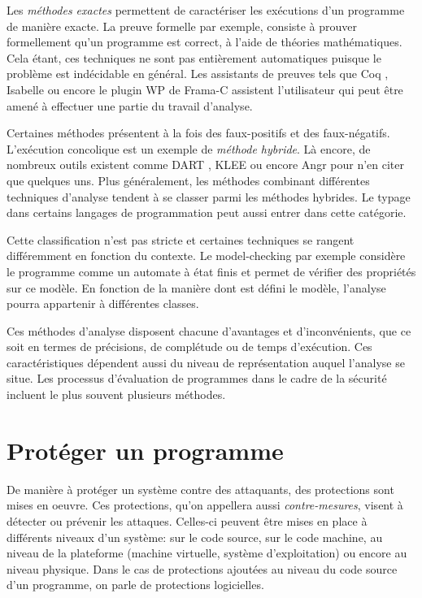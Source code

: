         Les \textit{méthodes exactes} permettent de caractériser les exécutions d'un programme de manière exacte. La preuve formelle par exemple, consiste à prouver formellement qu'un programme est correct, à l'aide de théories mathématiques. Cela étant, ces techniques ne sont pas entièrement automatiques puisque le problème est indécidable en général. Les assistants de preuves tels que Coq \cite{Coq}, Isabelle \cite{Nipokow/SSBM02} ou encore le plugin WP de Frama-C \cite{FramaC-wp} assistent l'utilisateur qui peut être amené à effectuer une partie du travail d'analyse.
        
        Certaines méthodes présentent à la fois des faux-positifs et des faux-négatifs. L'exécution concolique \cite{Baldoni/CSUR18} est un exemple de \textit{méthode hybride}. Là encore, de nombreux outils existent comme DART \cite{Godefroid/PLDI05}, KLEE \cite{Cadar/OSDI08} ou encore Angr \cite{Shoshitaishvili/SSP16} pour n'en citer que quelques uns. Plus généralement, les méthodes combinant différentes techniques d'analyse tendent à se classer parmi les méthodes hybrides.
        Le typage dans certains langages de programmation peut aussi entrer dans cette catégorie.
        
        Cette classification n'est pas stricte et certaines techniques se rangent différemment en fonction du contexte. Le model-checking par exemple considère le programme comme un automate à état finis et permet de vérifier des propriétés sur ce modèle. En fonction de la manière dont est  défini le modèle, l'analyse pourra appartenir à différentes classes. 
        
        Ces méthodes d'analyse disposent chacune d'avantages et d'inconvénients, que ce soit en termes de précisions, de complétude ou de temps d'exécution. Ces caractéristiques dépendent aussi du niveau de représentation auquel l'analyse se situe. Les processus d'évaluation de programmes dans le cadre de la sécurité incluent le plus souvent plusieurs méthodes.
        
    \section{Protéger un programme}
    
        De manière à protéger un système contre des attaquants, des protections sont mises en oeuvre. Ces protections, qu'on appellera aussi \textit{contre-mesures}, visent à détecter ou prévenir les attaques. Celles-ci peuvent être mises en place à différents niveaux d'un système: sur le code source, sur le code machine, au niveau de la plateforme (machine virtuelle, système d'exploitation) ou encore au niveau physique. Dans le cas de protections ajoutées au niveau du code source d'un programme, on parle de protections logicielles. 
    
